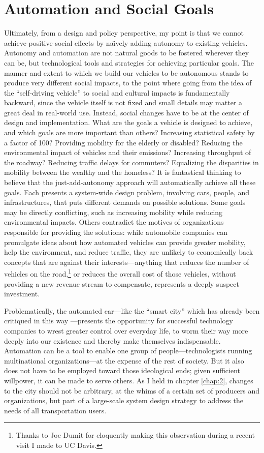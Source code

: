 \section{Automation and Social Goals}

Ultimately, from a design and policy perspective, my point is that we
cannot achieve positive social effects by na\"{\i}vely adding autonomy to
existing vehicles. Autonomy and automation are not natural goods to be
fostered wherever they can be, but technological tools and strategies
for achieving particular goals. The manner and extent to which we
build our vehicles to be autonomous stands to produce very different
social impacts, to the point where going from the idea of the
``self-driving vehicle'' to social and cultural impacts is
fundamentally backward, since the vehicle itself is not fixed and
small details may matter a great deal in real-world use. Instead,
social changes have to be at the center of design and implementation.
What are the goals a vehicle is designed to achieve, and which goals
are more important than others? Increasing
statistical safety by a factor of 100? Providing mobility for the
elderly or disabled? Reducing the environmental impact of vehicles and
their emissions? Increasing throughput of the roadway? Reducing
traffic delays for commuters? Equalizing the 
disparities in mobility between the wealthy and the homeless? It is
fantastical thinking to believe that the just-add-autonomy approach
will automatically achieve all these goals. Each presents a
system-wide design problem, involving cars, people, and
infrastructures, that puts different demands on possible
solutions. Some goals may be directly conflicting, such as increasing
mobility while reducing 
environmental impacts.
Others contradict the motives of organizations responsible for
providing the solutions:  while automobile companies can promulgate
ideas about how automated vehicles can provide greater mobility, help
the environment, and reduce traffic, they are unlikely to economically
back concepts that are against their interests---anything that reduces
the number of vehicles on the road,\footnote{Thanks to Joe Dumit for eloquently
  making this observation during a recent visit I made to UC Davis.}
or reduces the overall cost of those 
vehicles, without providing a new revenue stream to compensate,
represents a deeply suspect investment. 

Problematically, the automated car---like the
``smart city'' which has already been critiqued in this
way \cite{greenfieldSmart}---presents the opportunity for successful technology
companies to wrest greater control over everyday life, to worm their
way more deeply into our existence and thereby make themselves
indispensable. Automation can be a tool to enable one group of
people---technologists running multinational organizations---at the
expense of the rest of society.
But it also does not have to be employed toward those ideological
ends; given sufficient willpower, it can be made to serve others.
As I held in chapter \ref{chap:2}, changes to the city
should not be arbitrary, at the whims of a certain set of
producers and organizations, but part of a large-scale system design
strategy to address the needs of all transportation users.

